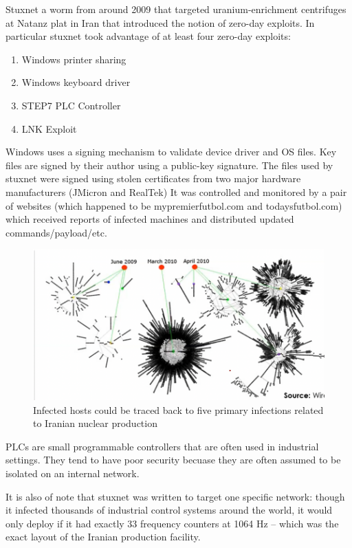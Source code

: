 \documentclass[../notes.tex]{subfiles}
\begin{document}
\begin{example}
    Stuxnet a worm from around 2009 that targeted uranium-enrichment centrifuges at Natanz plat in Iran that introduced the notion of zero-day exploits.
    In particular stuxnet took advantage of at least four zero-day exploits:

    \begin{enumerate}
        \item Windows printer sharing
        \item Windows keyboard driver
        \item STEP7 PLC Controller
        \item LNK Exploit
    \end{enumerate}

    Windows uses a signing mechanism to validate device driver and OS files. Key files are signed by their author using a public-key signature.
    The files used by stuxnet were signed using stolen certificates from two major hardware manufacturers (JMicron and RealTek)
    It was controlled and monitored by a pair of websites (which happened to be mypremierfutbol.com and todaysfutbol.com) which received reports of infected machines and distributed updated commands/payload/etc.
    \begin{figure}[H]
        \centering
        \includegraphics[width=0.8\linewidth]{img/image_2023-04-03-19-08-16.png}
        \caption{Infected hosts could be traced back to five primary infections related to Iranian nuclear production}
    \end{figure}

    PLCs are small programmable controllers that are often used in industrial settings. They tend to have poor security becuase they are often assumed to be isolated on an internal network.

    It is also of note that stuxnet was written to target one specific network: though it infected thousands of industrial control systems around the world, it would only deploy if it had exactly 33 frequency counters at 1064 Hz -- which was the exact layout of the Iranian production facility.


\end{example}
\end{document}

